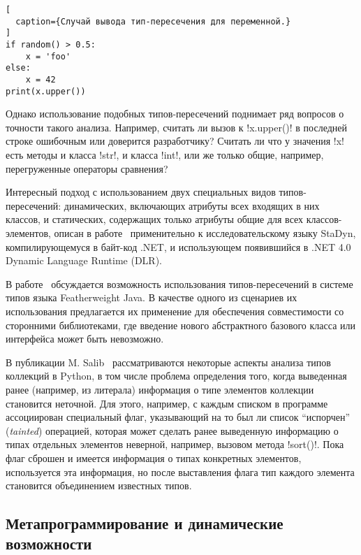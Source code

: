 \begin{lstlisting}[
  caption={Случай вывода тип-пересечения для переменной.}
]
if random() > 0.5:
    x = 'foo'
else:
    x = 42
print(x.upper())
\end{lstlisting}

Однако использование подобных типов-пересечений поднимает ряд вопросов о
точности такого анализа. Например, считать ли вызов к !x.upper()! в последней
строке ошибочным или доверится разработчику? Считать ли что у значения !x! есть
методы и класса !str!, и класса !int!, или же только общие, например,
перегруженные операторы сравнения?

Интересный подход с использованием двух специальных видов типов-пересечений:
динамических, включающих атрибуты всех входящих в них классов, и статических,
содержащих только атрибуты общие для всех классов-элементов, описан в
работе~\cite{Ortin2011:union} применительно к исследовательскому языку StaDyn,
компилирующемуся в байт-код .NET, и использующем появившийся в .NET 4.0 Dynamic
Language Runtime (DLR).


В работе~\cite{Igarashi2006} обсуждается возможность использования
типов-пересечений в системе типов языка Featherweight Java. В качестве одного из
сценариев их использования предлагается их применение для обеспечения
совместимости со сторонними библиотеками, где введение нового абстрактного
базового класса или интерфейса может быть невозможно.  

В публикации M. Salib~\cite{Salib2004} рассматриваются некоторые аспекты анализа
типов коллекций в Python, в том числе проблема определения того, когда
выведенная ранее (например, из литерала) информация о типе элементов коллекции
становится неточной. Для этого, например, с каждым списком в программе ассоциирован
специальный флаг, указывающий на то был ли список ``испорчен'' (\emph{tainted})
операцией, которая может сделать ранее выведенную информацию о типах отдельных
элементов неверной, например, вызовом метода !sort()!. Пока флаг сброшен и имеется
информация о типах конкретных элементов, используется эта информация, но после
выставления флага тип каждого элемента становится объединением известных типов.

\subsection{Метапрограммирование и динамические возможности}

